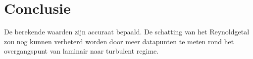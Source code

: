 \section{Conclusie}
De berekende waarden zijn accuraat bepaald.
De schatting van het Reynoldgetal zou nog kunnen verbeterd worden door meer datapunten 
te meten rond het overgangspunt van laminair naar turbulent regime.